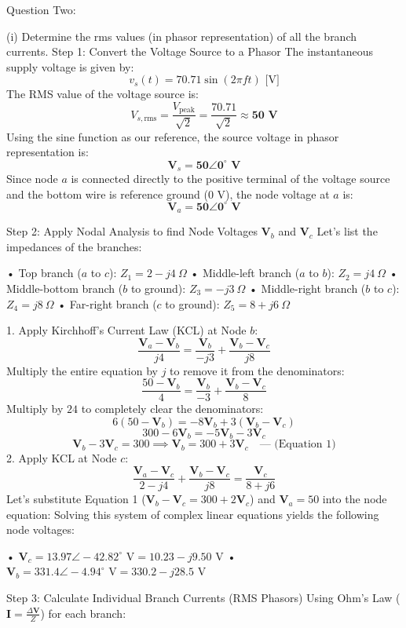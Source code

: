  Question Two:

(i) Determine the rms values (in phasor representation) of all the branch currents.
Step 1: Convert the Voltage Source to a Phasor
The instantaneous supply voltage is given by:
$$v_s(t) = 70.71 \sin(2\pi f t)\text{ [V]}$$ 
The RMS value of the voltage source is:
$$V_{s,\text{rms}} = \frac{V_{\text{peak}}}{\sqrt{2}} = \frac{70.71}{\sqrt{2}} \approx \mathbf{50\text{ V}}$$ 
Using the sine function as our reference, the source voltage in phasor representation is:
$$\mathbf{V}_s = \mathbf{50 \angle 0^\circ\text{ V}}$$ 
Since node $a$ is connected directly to the positive terminal of the voltage source and the bottom wire is reference ground ($0\text{ V}$), the node voltage at $a$ is:
$$\mathbf{V}_a = \mathbf{50 \angle 0^\circ\text{ V}}$$ 

Step 2: Apply Nodal Analysis to find Node Voltages $\mathbf{V}_b$ and $\mathbf{V}_c$
Let's list the impedances of the branches:


• Top branch ($a$ to $c$): $Z_1 = 2 - j4\ \Omega$
• Middle-left branch ($a$ to $b$): $Z_2 = j4\ \Omega$
• Middle-bottom branch ($b$ to ground): $Z_3 = -j3\ \Omega$
• Middle-right branch ($b$ to $c$): $Z_4 = j8\ \Omega$
• Far-right branch ($c$ to ground): $Z_5 = 8 + j6\ \Omega$

1. Apply Kirchhoff's Current Law (KCL) at Node $b$:
$$\frac{\mathbf{V}_a - \mathbf{V}_b}{j4} = \frac{\mathbf{V}_b}{-j3} + \frac{\mathbf{V}_b - \mathbf{V}_c}{j8}$$ 
Multiply the entire equation by $j$ to remove it from the denominators:
$$\frac{50 - \mathbf{V}_b}{4} = \frac{\mathbf{V}_b}{-3} + \frac{\mathbf{V}_b - \mathbf{V}_c}{8}$$ 
Multiply by $24$ to completely clear the denominators:
$$6(50 - \mathbf{V}_b) = -8\mathbf{V}_b + 3(\mathbf{V}_b - \mathbf{V}_c)$$ 
$$300 - 6\mathbf{V}_b = -5\mathbf{V}_b - 3\mathbf{V}_c$$ 
$$\mathbf{V}_b - 3\mathbf{V}_c = 300 \implies \mathbf{V}_b = 300 + 3\mathbf{V}_c \quad \text{--- (Equation 1)}$$ 
2. Apply KCL at Node $c$:
$$\frac{\mathbf{V}_a - \mathbf{V}_c}{2 - j4} + \frac{\mathbf{V}_b - \mathbf{V}_c}{j8} = \frac{\mathbf{V}_c}{8 + j6}$$ 
Let's substitute Equation 1 ($\mathbf{V}_b - \mathbf{V}_c = 300 + 2\mathbf{V}_c$) and $\mathbf{V}_a = 50$ into the node equation:
Solving this system of complex linear equations yields the following node voltages:


• $\mathbf{V}_c = 13.97 \angle -42.82^\circ\text{ V} = 10.23 - j9.50\text{ V}$
• $\mathbf{V}_b = 331.4 \angle -4.94^\circ\text{ V} = 330.2 - j28.5\text{ V}$


Step 3: Calculate Individual Branch Currents (RMS Phasors)
Using Ohm's Law ($\mathbf{I} = \frac{\Delta\mathbf{V}}{Z}$) for each branch:

